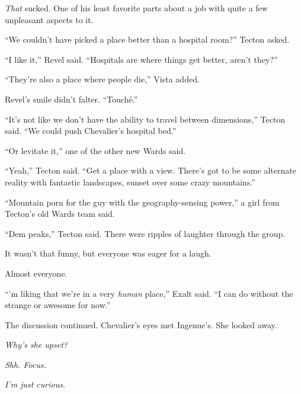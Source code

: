 \emph{That} sucked.  One of his least favorite parts about a job with quite a few unpleasant aspects to it.



``We couldn't have picked a place better than a hospital room?'' Tecton asked.



``I like it,'' Revel said.  ``Hospitals are where things get better, aren't they?''



``They're also a place where people die,'' Vista added.



Revel's smile didn't falter.  ``Touch\'{e}.''



``It's not like we don't have the ability to travel between dimensions,'' Tecton said.  ``We could push Chevalier's hospital bed.''



``Or levitate it,'' one of the other new Wards said.



``Yeah,'' Tecton said.  ``Get a place with a view.  There's got to be some alternate reality with fantastic landscapes, sunset over some crazy mountains.''



``Mountain porn for the guy with the geography-sensing power,'' a girl from Tecton's old Wards team said.



``Dem peaks,'' Tecton said.  There were ripples of laughter through the group.



It wasn't that funny, but everyone was eager for a laugh.



Almost everyone.



``\ldotsI'm liking that we're in a very \emph{human} place,'' Exalt said.  ``I can do without the strange or awesome for now.''



The discussion continued.  Chevalier's eyes met Ingenue's.  She looked away.



\emph{Why's she upset?}



\emph{Shh.  Focus.}



\emph{I'm just curious}.



